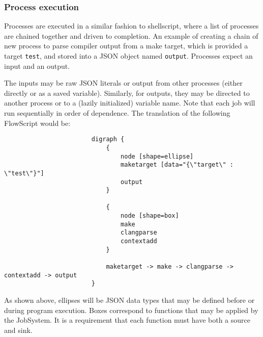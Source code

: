 \documentclass{article}
\begin{document}
			\subsubsection{Process execution}
				Processes are executed in a similar fashion to shellscript, where a list of processes are chained together and driven to completion. An example of creating a chain of new process to parse compiler output from a make target, which is provided a target \texttt{test}, and stored into a JSON object named \texttt{output}. Processes expect an input and an output. 
				
				The inputs may be raw JSON literals or output from other processes (either directly or as a saved variable). Similarly, for outputs, they may be directed to another process or to a (lazily initialized) variable name. Note that each job will run sequentially in order of dependence. The translation of the following FlowScript would be:
					\begin{verbatim}
						digraph {
						    {
						        node [shape=ellipse]
						        maketarget [data="{\"target\" : \"test\"}"]
						        output
						    }

						    {
						        node [shape=box]
						        make
						        clangparse
						        contextadd
						    }

						    maketarget -> make -> clangparse -> contextadd -> output
						}
					\end{verbatim}
				As shown above, ellipses will be JSON data types that may be defined before or during program execution. Boxes correspond to functions that may be applied by the JobSystem. It is a requirement that each function must have both a source and sink.
\end{document}
